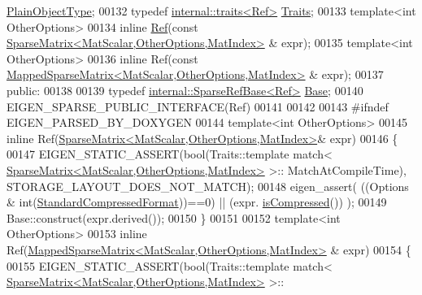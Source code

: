 \begin{DoxyCode}
      \hyperlink{group___sparse_core___module_class_eigen_1_1_sparse_matrix}{PlainObjectType};
00132     \textcolor{keyword}{typedef} \hyperlink{struct_eigen_1_1internal_1_1traits}{internal::traits<Ref>} \hyperlink{struct_eigen_1_1internal_1_1traits}{Traits};
00133     \textcolor{keyword}{template}<\textcolor{keywordtype}{int} OtherOptions>
00134     \textcolor{keyword}{inline} \hyperlink{group___core___module_class_eigen_1_1_ref}{Ref}(\textcolor{keyword}{const} \hyperlink{group___sparse_core___module_class_eigen_1_1_sparse_matrix}{SparseMatrix<MatScalar,OtherOptions,MatIndex>}
      & expr);
00135     \textcolor{keyword}{template}<\textcolor{keywordtype}{int} OtherOptions>
00136     \textcolor{keyword}{inline} Ref(\textcolor{keyword}{const} \hyperlink{class_eigen_1_1_mapped_sparse_matrix}{MappedSparseMatrix<MatScalar,OtherOptions,MatIndex>}
      & expr);
00137   \textcolor{keyword}{public}:
00138 
00139     \textcolor{keyword}{typedef} \hyperlink{class_eigen_1_1internal_1_1_sparse_ref_base}{internal::SparseRefBase<Ref>} \hyperlink{class_eigen_1_1internal_1_1_sparse_ref_base}{Base};
00140     EIGEN\_SPARSE\_PUBLIC\_INTERFACE(Ref)
00141 
00142 
00143     \textcolor{preprocessor}{#ifndef EIGEN\_PARSED\_BY\_DOXYGEN}
00144     \textcolor{keyword}{template}<\textcolor{keywordtype}{int} OtherOptions>
00145     \textcolor{keyword}{inline} Ref(\hyperlink{group___sparse_core___module_class_eigen_1_1_sparse_matrix}{SparseMatrix<MatScalar,OtherOptions,MatIndex>}& 
      expr)
00146     \{
00147       EIGEN\_STATIC\_ASSERT(\textcolor{keywordtype}{bool}(Traits::template match<
      \hyperlink{group___sparse_core___module_class_eigen_1_1_sparse_matrix}{SparseMatrix<MatScalar,OtherOptions,MatIndex>} >::
      MatchAtCompileTime), STORAGE\_LAYOUT\_DOES\_NOT\_MATCH);
00148       eigen\_assert( ((Options & \textcolor{keywordtype}{int}(\hyperlink{namespace_eigen_a668ffb0fb66c55c1c98bd35c52df648eaf81fc519ed9cc0ebc6aac69a366086a5}{StandardCompressedFormat}))==0) || (expr.
      \hyperlink{group___sparse_core___module_a837934b33a80fe996ff20500373d3a61}{isCompressed}()) );
00149       Base::construct(expr.derived());
00150     \}
00151     
00152     \textcolor{keyword}{template}<\textcolor{keywordtype}{int} OtherOptions>
00153     \textcolor{keyword}{inline} Ref(\hyperlink{class_eigen_1_1_mapped_sparse_matrix}{MappedSparseMatrix<MatScalar,OtherOptions,MatIndex>}
      & expr)
00154     \{
00155       EIGEN\_STATIC\_ASSERT(\textcolor{keywordtype}{bool}(Traits::template match<
      \hyperlink{group___sparse_core___module_class_eigen_1_1_sparse_matrix}{SparseMatrix<MatScalar,OtherOptions,MatIndex>} >::

\end{DoxyCode}
